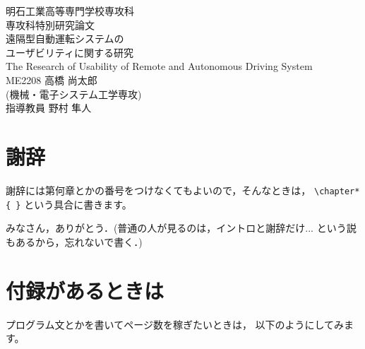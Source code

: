 \documentclass[a4paper,12pt]{jreport}
\begin{document}
\vspace*{2cm}
\thispagestyle{empty}
\begin{spacing}{1}
\begin{center}
{\Large 明石工業高等専門学校専攻科 \\[1truecm]
専攻科特別研究論文} \\[3.5truecm]
\huge 遠隔型自動運転システムの \\
\huge ユーザビリティに関する研究 \\
\LARGE The Research of Usability of Remote and Autonomous Driving System\\[4truecm]
\Large ME2208 高橋 尚太郎 \\
(機械・電子システム工学専攻) \\[1truecm]
指導教員 野村 隼人
\end{center}
\tableofcontents
\end{spacing}
\newpage
\clearpage
{}
\pagestyle{fancy}
\setlength{\headheight}{5truemm}







\chapter*{謝辞}

謝辞には第何章とかの番号をつけなくてもよいので，そんなときは，
\verb|\chapter*{ }| という具合に書きます。

みなさん，ありがとう．(普通の人が見るのは，イントロと謝辞だけ...
という説もあるから，忘れないで書く．)

\appendix
\chapter{付録があるときは}
プログラム文とかを書いてページ数を稼ぎたいときは，
以下のようにしてみます。
\end{document}
